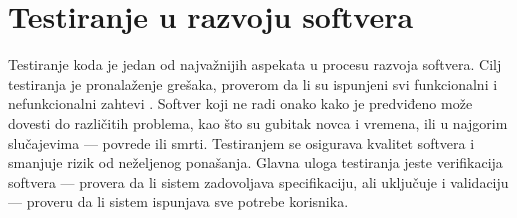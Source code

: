 \documentclass[12pt,oneside]{memoir}
\begin{document}
\section{Testiranje u razvoju softvera}
\label{sec:piramid}

\par Testiranje koda je jedan od najvažnijih aspekata u procesu razvoja softvera. Cilj testiranja je pronalaženje grešaka, proverom da li su ispunjeni svi funkcionalni i nefunkcionalni zahtevi \cite{test}.  Softver koji ne radi onako kako je predviđeno može dovesti do različitih problema, kao što su gubitak novca i vremena, ili u najgorim slučajevima --- povrede ili smrti. Testiranjem se osigurava kvalitet softvera i smanjuje rizik od neželjenog ponašanja. Glavna uloga testiranja jeste verifikacija softvera --- provera da li sistem zadovoljava specifikaciju, ali uključuje i validaciju --- proveru da li sistem ispunjava sve potrebe korisnika.  

\end{document}
